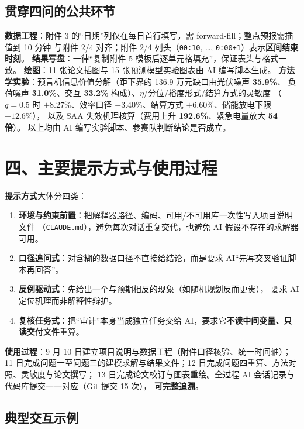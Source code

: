 \documentclass[11pt,a4paper,fontset=fandol]{ctexart}
\begin{document}
\subsection*{贯穿四问的公共环节}

\textbf{数据工程}：附件 3 的“日期”列仅在每日首行填写，需 forward-fill；整点预报需插值到 10 分钟
与附件 2/4 对齐；附件 2/4 列头（\texttt{00:10}, \ldots, \texttt{0:00+1}）表示\textbf{区间结束时刻}。
\textbf{结果写盘}：一律“复制附件 5 模板后逐单元格填充”，保证表头与格式一致。
\textbf{绘图}：11 张论文插图与 15 张预测模型实验图表由 AI 编写脚本生成。
\textbf{方法学实验}：预言机信息价值分解（距下界的 136.9 万元缺口由光伏噪声 \textbf{35.9\%}、
负荷噪声 \textbf{31.0\%}、交互 \textbf{33.2\%} 构成）、$\eta$/分位/裕度形式/结算方式的灵敏度
（$q=0.5$ 时 $+8.27\%$、效率口径 $-3.40\%$、结算方式 $+6.60\%$、储能放电下限 $+12.6\%$），
以及 SAA 失效机理核算（费用上升 \textbf{192.6\%}、紧急电量放大 \textbf{54 倍}）。
以上均由 AI 编写实验脚本、参赛队判断结论是否成立。

\section*{四、主要提示方式与使用过程}

\textbf{提示方式}大体分四类：

\begin{enumerate}[label=(\arabic*), leftmargin=2.4em]
  \item \textbf{环境与约束前置}：把解释器路径、编码、可用/不可用库一次性写入项目说明文件
        （\texttt{CLAUDE.md}），避免每次对话重复交代，也避免 AI 假设不存在的求解器可用。
  \item \textbf{口径追问式}：对含糊的数据口径不直接给结论，而是要求 AI“先写交叉验证脚本再回答”。
  \item \textbf{反例驱动式}：先给出一个与预期相反的现象（如随机规划反而更贵），
        要求 AI 定位机理而非解释性辩护。
  \item \textbf{复核任务式}：把“审计”本身当成独立任务交给 AI，要求它\textbf{不读中间变量、只读交付文件}重算。
\end{enumerate}

\textbf{使用过程}：9 月 10 日建立项目说明与数据工程（附件口径核验、统一时间轴）；
11 日完成问题一至问题三的建模求解与结果文件；12 日完成问题四重算、方法对照、灵敏度与论文撰写；
13 日完成论文校订与图表重绘。全过程 AI 会话记录与代码库提交一一对应（Git 提交 15 次），
\textbf{可完整追溯}。

\subsection*{典型交互示例}
\end{document}
